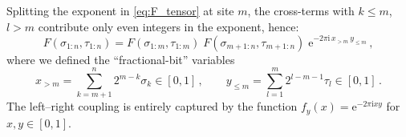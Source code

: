 \documentclass[11pt,a4paper]{article}
\theoremstyle{definition}
\theoremstyle{remark}
\newcommand{\ee}{\mathrm{e}}
\newcommand{\ii}{\mathrm{i}}
\begin{document}
Splitting the exponent in \eqref{eq:F_tensor} at site $m$, the cross-terms with $k\le m$, $l>m$ contribute only even integers in the exponent, hence:
\begin{equation}\label{eq:factorization}
  F(\sigma_{1:n},\tau_{1:n}) = F(\sigma_{1:m},\tau_{1:m})\;
  F(\sigma_{m+1:n},\tau_{m+1:n})\;
  \ee^{-2\pi\ii\, x_{>m}\, y_{\le m}}\,,
\end{equation}
where we defined the ``fractional-bit'' variables
\begin{equation}\label{eq:xy_def}
  x_{>m} = \sum_{k=m+1}^n 2^{m-k}\sigma_k \in [0,1]\,,\qquad
  y_{\le m} = \sum_{l=1}^m 2^{l-m-1}\tau_l \in [0,1]\,.
\end{equation}
The left--right coupling is entirely captured by the function $f_y(x) = \ee^{-2\pi\ii xy}$ for $x,y\in[0,1]$.
\end{document}
